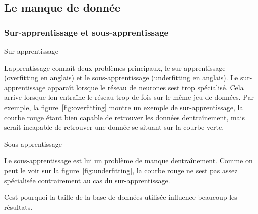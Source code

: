 \documentclass[11pt,final,ENIB]{sdm}
\begin{document}
{	\subsection{Le manque de donn\'ee}
	\label{seq:noData}

		\subsubsection{Sur-apprentissage et sous-apprentissage}
			\begin{itshape}Sur-apprentissage\end{itshape}

			L\textquotesingle apprentissage conna\^it deux probl\`emes principaux, le sur-apprentissage (overfitting en anglais) et le sous-apprentissage (underfitting en anglais).
			Le sur-apprentissage appara\^it lorsque le r\'eseau de neurones s\textquotesingle est trop sp\'ecialis\'e. Cela arrive lorsque l\textquotesingle on entra\^ine le r\'eseau trop de fois sur le m\^eme jeu de donn\'ees. Par exemple, la figure~\ref{fig:overfitting} montre un exemple de sur-apprentissage, la courbe rouge \'etant bien capable de retrouver les donn\'ees d\textquotesingle entra\^inement, mais serait incapable de retrouver une donn\'ee se situant sur la courbe verte.

			\begin{itshape}Sous-apprentissage\end{itshape}
			Le sous-apprentissage est lui un probl\`eme de manque d\textquotesingle entra\^inement. Comme on peut le voir sur la figure~\ref{fig:underfitting}, la courbe rouge ne s\textquotesingle est pas assez sp\'ecialis\'ee contrairement au cas du sur-apprentissage.

			C\textquotesingle est pourquoi la taille de la base de donn\'ees utilis\'ee influence beaucoup les r\'esultats.


}
\end{document}
